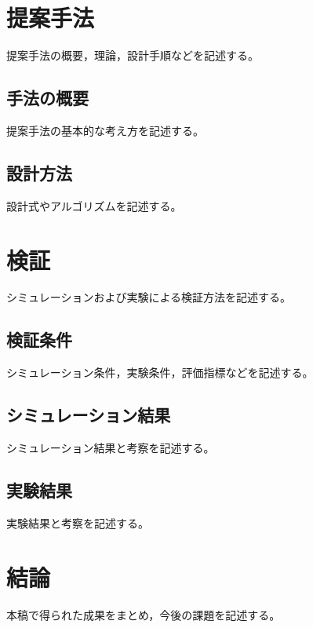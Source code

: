 \documentclass[dvipdfmx,usejistfm]{ieej-tec2}
\begin{document}
\section{提案手法}
提案手法の概要，理論，設計手順などを記述する。

\subsection{手法の概要}
提案手法の基本的な考え方を記述する。

\subsection{設計方法}
設計式やアルゴリズムを記述する。

\section{検証}
シミュレーションおよび実験による検証方法を記述する。

\subsection{検証条件}
シミュレーション条件，実験条件，評価指標などを記述する。

\subsection{シミュレーション結果}
シミュレーション結果と考察を記述する。

\subsection{実験結果}
実験結果と考察を記述する。

\section{結論}
本稿で得られた成果をまとめ，今後の課題を記述する。



\end{document}
